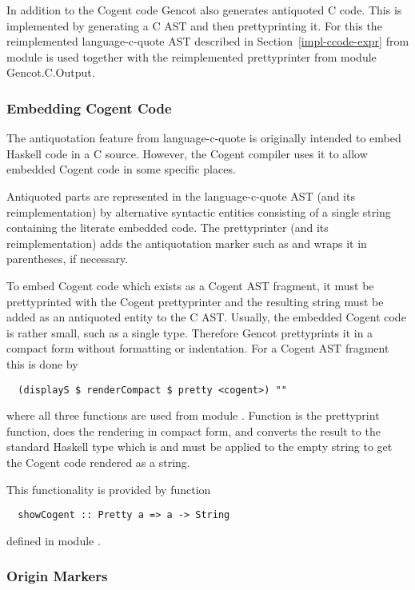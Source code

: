 In addition to the Cogent code Gencot also generates antiquoted C code. This is implemented by generating 
a C AST and then prettyprinting it. For this the reimplemented language-c-quote AST described in 
Section~\ref{impl-ccode-expr} from module  is used together with the reimplemented 
prettyprinter from module Gencot.C.Output.

\subsubsection{Embedding Cogent Code}

The antiquotation feature from language-c-quote is originally intended to embed Haskell code in a C source.
However, the Cogent compiler uses it to allow embedded Cogent code in some specific places.

Antiquoted parts are represented in the language-c-quote AST (and its reimplementation) by alternative syntactic
entities consisting of a single string containing the literate embedded code. The prettyprinter (and its 
reimplementation) adds the antiquotation marker such as  and wraps it in parentheses, if necessary.

To embed Cogent code which exists as a Cogent AST fragment, it must be prettyprinted with the Cogent prettyprinter
and the resulting string must be added as an antiquoted entity to the C AST. Usually, the embedded Cogent code 
is rather small, such as a single type. Therefore Gencot prettyprints it in a compact form without formatting or
indentation. For a Cogent AST fragment  this is done by
\begin{verbatim}
  (displayS $ renderCompact $ pretty <cogent>) ""
\end{verbatim}
where all three functions are used from module . Function  is 
the prettyprint function,  does the rendering in compact form, and  converts
the result to the standard Haskell type  which is  and must be applied to
the empty string to get the Cogent code rendered as a string.

This functionality is provided by function 
\begin{verbatim}
  showCogent :: Pretty a => a -> String
\end{verbatim}
defined in module .

\subsubsection{Origin Markers}

